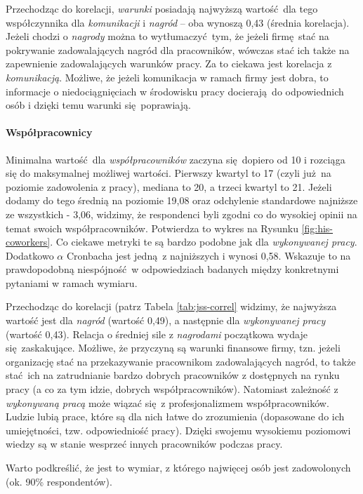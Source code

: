 Przechodząc do korelacji, \textit{warunki} posiadają najwyższą wartość dla tego współczynnika dla \textit{komunikacji} i \textit{nagród} -- oba wynoszą 0,43 (średnia korelacja). Jeżeli chodzi o \textit{nagrody} można to wytłumaczyć tym, że jeżeli firmę stać na pokrywanie zadowalających nagród dla pracowników, wówczas stać ich także na zapewnienie zadowalających warunków pracy. Za to ciekawa jest korelacja z \textit{komunikacją}. Możliwe, że jeżeli komunikacja w ramach firmy jest dobra, to informacje o niedociągnięciach w
środowisku pracy docierają do odpowiednich osób i dzięki temu warunki się poprawiają. 

\paragraph{Współpracownicy} Minimalna wartość dla \textit{współpracowników} zaczyna się dopiero od 10 i rozciąga się do maksymalnej możliwej wartości. Pierwszy kwartyl to 17 (czyli już na poziomie zadowolenia z pracy), mediana to 20, a trzeci kwartyl to 21. Jeżeli dodamy do tego średnią na poziomie 19,08 oraz odchylenie standardowe najniższe ze wszystkich - 3,06, widzimy, że respondenci byli zgodni co do wysokiej opinii na temat swoich współpracowników. Potwierdza to wykres
na Rysunku \ref{fig:his-coworkers}. Co ciekawe metryki te są bardzo podobne jak dla \textit{wykonywanej pracy}. Dodatkowo $\alpha$ Cronbacha jest jedną z najniższych i wynosi 0,58. Wskazuje to na prawdopodobną niespójność w odpowiedziach badanych między konkretnymi pytaniami w ramach wymiaru.

Przechodząc do korelacji (patrz Tabela \ref{tab:jss-correl} widzimy, że najwyższa wartość jest dla \textit{nagród} (wartość 0,49), a następnie dla \textit{wykonywanej pracy} (wartość 0,43). Relacja o średniej sile z \textit{nagrodami} początkowa wydaje się zaskakujące. Możliwe, że przyczyną są warunki finansowe firmy, tzn. jeżeli organizację stać na przekazywanie pracownikom zadowalających nagród, to także stać ich na zatrudnianie bardzo dobrych pracowników z dostępnych
na rynku pracy (a co za tym idzie, dobrych współpracowników). Natomiast zależność z \textit{wykonywaną pracą} może wiązać się z profesjonalizmem współpracowników. Ludzie lubią prace, które są dla nich łatwe do zrozumienia (dopasowane do ich umiejętności, tzw. odpowiedniość pracy). Dzięki swojemu wysokiemu poziomowi wiedzy są w stanie wesprzeć innych pracowników podczas pracy.

Warto podkreślić, że jest to wymiar, z którego najwięcej osób jest zadowolonych (ok. 90\% respondentów).


